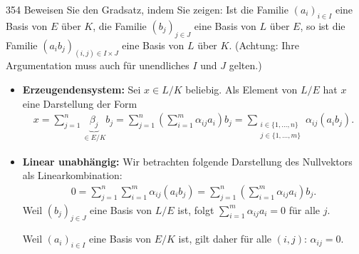 \begin{algebraUE}{354}
Beweisen Sie den Gradsatz, indem Sie zeigen: Ist die Familie $(a_i)_{i \in I}$
eine Basis von $E$ über $K$, die Familie $(b_j)_{j \in J}$ eine Basis von $L$ über $E$,
so ist die Familie $(a_ib_j)_{(i,j) \in I \times J}$ eine Basis von $L$ über $K$.
(Achtung: Ihre Argumentation muss auch für unendliches $I$ und $J$ gelten.)

\end{algebraUE}

\begin{solution}
  \begin{itemize}
      \item \textbf{Erzeugendensystem:} Sei $x \in L/K$ beliebig. Als Element von $L/E$ hat $x$ eine Darstellung der Form
  \begin{align}
      x = \sum_{j=1}^n \underbrace{\beta_j}_{\in E/K} b_j = \sum_{j=1}^n \left(\sum_{i=1}^m \alpha_{ij} a_i \right) b_j = \sum_{\substack{i \in \{1, ..., n\} \\ {j\in \{1,...,m\}}}} \alpha_{ij} (a_i b_j).
  \end{align}
  \item \textbf{Linear unabhängig:} Wir betrachten folgende Darstellung des Nullvektors als Linearkombination:
  \begin{align}
      0 = \sum_{j=1}^n \sum_{i=1}^m \alpha_{ij} (a_i b_j) = \sum_{j=1}^n \left(\sum_{i=1}^m \alpha_{ij} a_i\right) b_j.
  \end{align}
  Weil $(b_j)_{j \in J}$ eine Basis von $L/E$ ist, folgt $\sum_{i=1}^m \alpha_{ij} a_i = 0$ für alle $j.$

  Weil $(a_i)_{i \in I}$ eine Basis von $E/K$ ist, gilt daher für alle $(i,j)$: $\alpha_{ij} = 0$.
  \end{itemize}
\end{solution}
